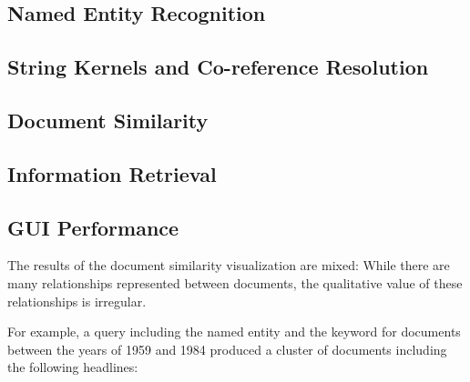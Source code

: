 
\subsection {Named Entity Recognition}
\label{sec:named_entity_recognition}

\subsection {String Kernels and Co-reference Resolution}
\label{sec:string_kernels_and_co-reference_resolution}

\subsection {Document Similarity}
\label{sec:document_similarity}

\subsection {Information Retrieval}
\label{sec:information_retrieval}

\subsection {GUI Performance}
\label{sec:gui_performance}
The results of the document similarity visualization are mixed: While there are many relationships represented between documents, the qualitative value of these relationships is irregular.

For example, a query including the named entity  and the keyword  for documents between the years of 1959 and 1984 produced a cluster of documents including the following headlines:


